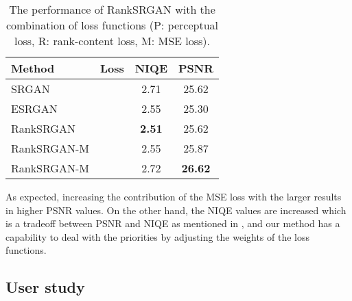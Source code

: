 \documentclass[10pt,twocolumn,letterpaper]{article}
\begin{document}
\begin{table}[h]
\small \setlength{\abovecaptionskip}{-0.1cm} 
\setlength{\belowcaptionskip}{-0.4cm}
\begin{center}
\begin{tabular}{l|c|cc}
\hline\hline
Method & Loss &NIQE&PSNR \\
\hline
SRGAN&&2.71&25.62\\
ESRGAN&&2.55&25.30\\

\hline
RankSRGAN&&\textbf{2.51}&25.62\\
RankSRGAN-M&&2.55&25.87\\
RankSRGAN-M&&2.72&\textbf{26.62}\\

\hline
\end{tabular}
\end{center}
\caption{The performance of RankSRGAN with the combination of loss functions (P: perceptual loss, R: rank-content loss, M: MSE loss).  }
\label{table:different loss}
\end{table}
As expected, increasing the contribution of the MSE loss with the larger  results in higher PSNR values. On the other hand, the NIQE values are increased which is a tradeoff between PSNR and NIQE as mentioned in \cite{blau2018perception}, and our method has a capability to deal with the priorities by adjusting the weights of the loss functions.  


\subsection{User study}
\label{section: user study}
\end{document}
